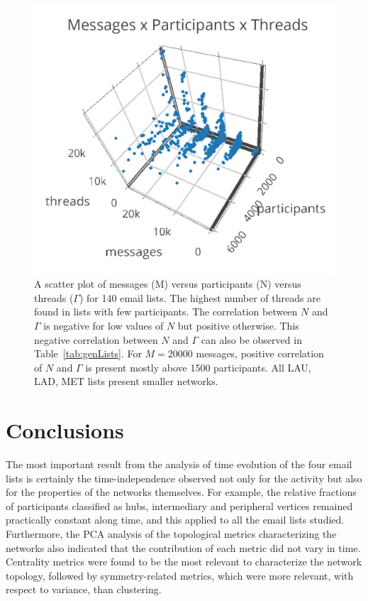 \documentclass[%
	aip,
	jmp,%
	amsmath,amssymb,
	reprint,%
]{revtex4-1}
\begin{document}
\begin{figure}
   \centering
        \includegraphics[width=\columnwidth]{figs/mpgamma____________}
	\caption{A scatter plot of messages (M) versus participants (N) versus threads ($\Gamma$) for 140 email lists. The highest number of threads are found in lists with few participants. The correlation between $N$ and $\Gamma$ is negative for low values of $N$ but positive otherwise. This negative correlation between $N$ and $\Gamma$ can also be observed in Table~\ref{tab:genLists}. For $M=20000$ messages, positive correlation of $N$ and $\Gamma$ is present mostly above 1500 participants. All LAU, LAD, MET lists present smaller networks.}
	\label{fig:nmgamma3d}
\end{figure}



\section{Conclusions}\label{sec:conc}
The most important result from the analysis of time evolution of the four email lists is certainly the time-independence observed not only for the activity but also for the properties of the networks themselves.
For example, the relative fractions of participants classified as hubs, intermediary and peripheral vertices remained practically constant along time, and this applied to all the email lists studied.
Furthermore, the PCA analysis of the topological metrics characterizing the networks also indicated that the contribution of each metric did not vary in time.
Centrality metrics were found to be the most relevant to characterize the network topology, followed by symmetry-related metrics, which were more relevant, with respect to variance, than clustering. 
\end{document}
